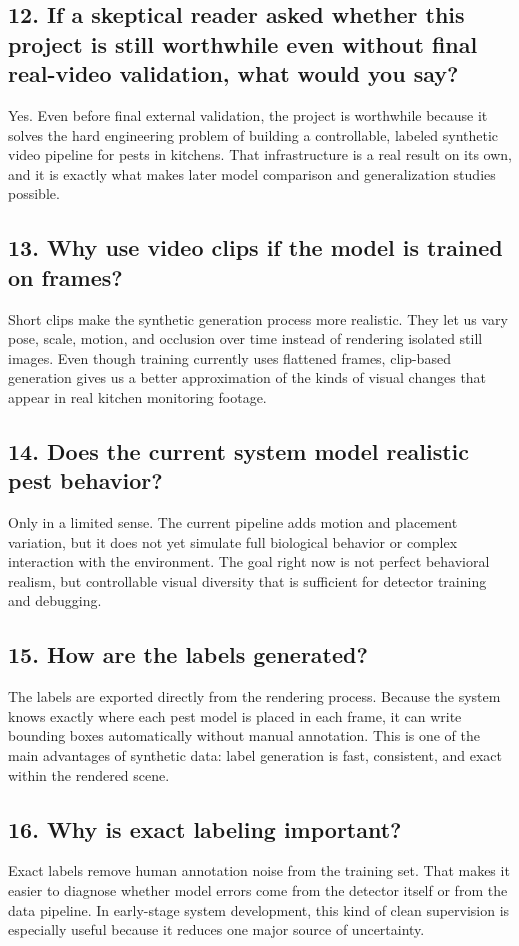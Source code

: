 \documentclass[11pt]{article}
\begin{document}
\subsection*{12. If a skeptical reader asked whether this project is still worthwhile even without final real-video validation, what would you say?}
Yes. Even before final external validation, the project is worthwhile because it solves the hard engineering problem of building a controllable, labeled synthetic video pipeline for pests in kitchens. That infrastructure is a real result on its own, and it is exactly what makes later model comparison and generalization studies possible.

\subsection*{13. Why use video clips if the model is trained on frames?}
Short clips make the synthetic generation process more realistic. They let us vary pose, scale, motion, and occlusion over time instead of rendering isolated still images. Even though training currently uses flattened frames, clip-based generation gives us a better approximation of the kinds of visual changes that appear in real kitchen monitoring footage.

\subsection*{14. Does the current system model realistic pest behavior?}
Only in a limited sense. The current pipeline adds motion and placement variation, but it does not yet simulate full biological behavior or complex interaction with the environment. The goal right now is not perfect behavioral realism, but controllable visual diversity that is sufficient for detector training and debugging.

\subsection*{15. How are the labels generated?}
The labels are exported directly from the rendering process. Because the system knows exactly where each pest model is placed in each frame, it can write bounding boxes automatically without manual annotation. This is one of the main advantages of synthetic data: label generation is fast, consistent, and exact within the rendered scene.

\subsection*{16. Why is exact labeling important?}
Exact labels remove human annotation noise from the training set. That makes it easier to diagnose whether model errors come from the detector itself or from the data pipeline. In early-stage system development, this kind of clean supervision is especially useful because it reduces one major source of uncertainty.
\end{document}
